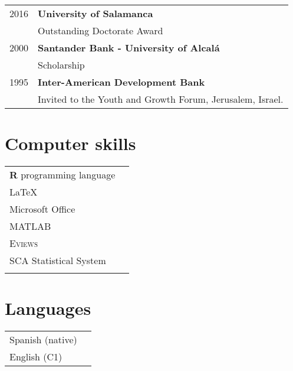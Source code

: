 \documentclass[11pt]{article}\usepackage[]{graphicx}\usepackage[]{color}
\begin{document}
\begin{enumerate}
\begin{tabular}{rl}

2016   & \textbf{University of Salamanca}\\
& Outstanding Doctorate Award\\

2000	 & \textbf{Santander Bank - University of Alcalá}\\
&  Scholarship\\

1995 & \textbf{Inter-American Development Bank}\\
& Invited to the Youth and Growth Forum, Jerusalem, Israel.

\end{tabular}


\section{Computer skills} 

\begin{tabular}{ll}
\textbf{\textsf{R}} programming language\\
{\LaTeX}\\
Microsoft Office\\
\textsc{MATLAB}\\
\textsc{Eviews}\\
SCA Statistical System\\
&
\end{tabular}


\section{Languages} 

\begin{tabular}{ll}
Spanish (native)\\
English (C1)
\end{tabular}


\end{enumerate}
\end{document}
